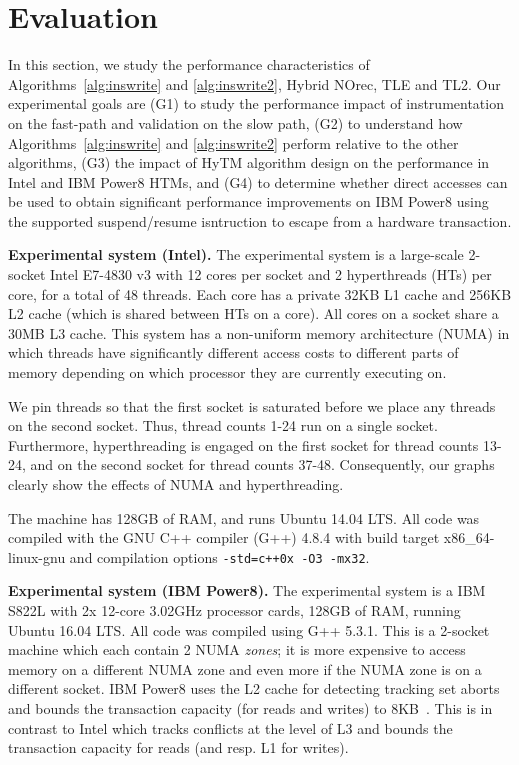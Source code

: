 \section{Evaluation}
\label{sec:eval}
%
In this section, we study the performance characteristics of Algorithms~\ref{alg:inswrite} and \ref{alg:inswrite2}, Hybrid NOrec, TLE and TL2.
Our experimental goals are (G1) to study the performance impact of instrumentation on the fast-path and validation on the slow path, 
(G2) to understand how Algorithms~\ref{alg:inswrite} and \ref{alg:inswrite2} perform relative to the other algorithms,
(G3) the impact of HyTM algorithm design on the performance in Intel and IBM Power8 HTMs, and 
(G4) to determine whether direct accesses can be used to obtain significant performance improvements on IBM Power8 using the supported suspend/resume isntruction to escape from a hardware transaction.

\vspace{1mm}\noindent\textbf{Experimental system (Intel).}
The experimental system is a large-scale 2-socket Intel E7-4830 v3 with 12 cores per socket and 2 hyperthreads (HTs) per core, for a total of 48 threads.
Each core has a private 32KB L1 cache and 256KB L2 cache (which is shared between HTs on a core).
All cores on a socket share a 30MB L3 cache.
This system has a non-uniform memory architecture (NUMA) in which threads have significantly different access costs to different parts of memory depending on which processor they are currently executing on.

We pin threads so that the first socket is saturated before we place any threads on the second socket.
Thus, thread counts 1-24 run on a single socket.
Furthermore, hyperthreading is engaged on the first socket for thread counts 13-24, and on the second socket for thread counts 37-48.
Consequently, our graphs clearly show the effects of NUMA and hyperthreading.

The machine has 128GB of RAM, and runs Ubuntu 14.04 LTS.
All code was compiled with the GNU C++ compiler (G++) 4.8.4 with build target x86\_64-linux-gnu and compilation options \texttt{-std=c++0x -O3 -mx32}.

\vspace{1mm}\noindent\textbf{Experimental system (IBM Power8).}
The experimental system is a IBM S822L with 2x 12-core 3.02GHz processor cards, 128GB of RAM, running Ubuntu 16.04 LTS.
All code was compiled using G++ 5.3.1. This is a 2-socket machine which each contain 2 NUMA \emph{zones}; it is more expensive to access memory on a different NUMA zone and even more if the NUMA zone is on a different 
socket. IBM Power8 uses the L2 cache for detecting tracking set aborts and bounds the transaction capacity (for reads and writes) to 8KB~\cite{htm-survey}.
This is in contrast to Intel which tracks conflicts at the level of L3 and bounds the transaction capacity for reads (and resp. L1 for writes).

